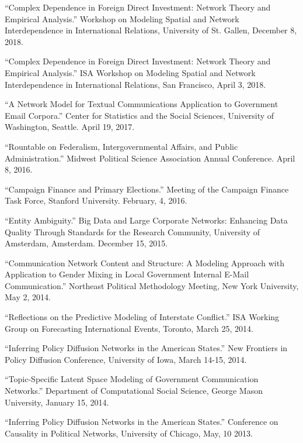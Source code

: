 \documentclass[overlapped,line]{res}
\begin{document}
\begin{resume}
\begin{etaremune}
\item ``Complex Dependence in Foreign Direct Investment: Network Theory and Empirical Analysis.'' Workshop on Modeling Spatial and Network Interdependence in International Relations, University of St. Gallen, December 8, 2018.
\item ``Complex Dependence in Foreign Direct Investment: Network Theory and Empirical Analysis.'' ISA Workshop on Modeling Spatial and Network Interdependence in International Relations, San Francisco, April 3, 2018.
\item ``A Network Model for Textual Communications Application to Government Email Corpora.'' Center for Statistics and the Social Sciences, University of Washington, Seattle. April 19, 2017.
\item ``Rountable on Federalism, Intergovernmental Affairs, and Public Administration.'' Midwest Political Science Association Annual Conference. April 8, 2016. 
\item ``Campaign Finance and Primary Elections.'' Meeting of the Campaign Finance Task Force, Stanford University. February, 4, 2016.
\item ``Entity Ambiguity.'' Big Data and Large Corporate Networks: Enhancing Data Quality Through Standards for the Research Community, University of Amsterdam, Amsterdam. December 15, 2015. 
\item ``Communication Network Content and Structure: A Modeling Approach with Application to Gender Mixing in Local Government Internal E-Mail Communication.'' Northeast Political Methodology Meeting, New York University, May 2, 2014.
\item ``Reflections on the Predictive Modeling of Interstate Conflict.'' ISA Working Group on Forecasting International Events, Toronto, March 25, 2014.
\item ``Inferring Policy Diffusion Networks in the American States.'' New Frontiers in Policy Diffusion Conference, University of  Iowa,  March 14-15, 2014.
\item  ``Topic-Specific Latent Space Modeling of Government Communication Networks.'' Department of Computational Social Science, George Mason University, January 15, 2014.
\item ``Inferring Policy Diffusion Networks in the American States.'' Conference on Causality in Political Networks, University of Chicago, May, 10 2013.
\end{etaremune}


\end{resume}
\end{document}
